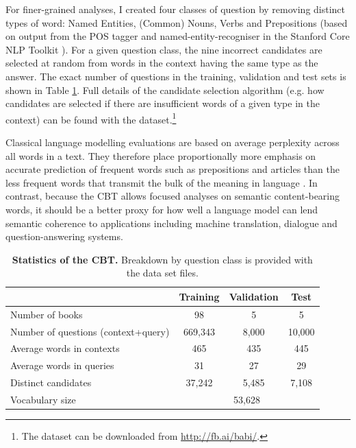 For finer-grained analyses, I created four classes of question by removing distinct types of word: Named Entities, (Common) Nouns, Verbs and Prepositions (based on output from the POS tagger and named-entity-recogniser in the Stanford Core NLP Toolkit \citep{manning2014stanford}). For a given question class, the nine incorrect candidates are selected at random from words in the context having the same type as the answer. The exact number of questions in the training, validation and test sets is shown in Table \ref{tab:cbt_stat}. Full details of the candidate selection algorithm (e.g. how candidates are selected if there are insufficient words of a given type in the context) can be found with the dataset.\footnote{The dataset can be downloaded from \url{http://fb.ai/babi/}.}

Classical language modelling evaluations are based on average perplexity across all words in a text. They therefore place proportionally more emphasis on accurate prediction of frequent words such as prepositions and articles than the less frequent words that transmit the bulk of the meaning in language \citep{baayen1996word}. In contrast, because the CBT allows focused analyses on semantic content-bearing words, it should be a better proxy for how well a language model can lend semantic coherence to applications including machine translation, dialogue and question-answering systems. 


\vspace{-2mm}
\begin{table}[ht]
\label{tab:cbt_stat}
  \begin{center}
    {\small 
      {\sc 
        \begin{tabular}{l|ccc}
          & Training & Validation & Test \\
          \hline
          \hline
          Number of books & 98 & 5 & 5 \\
          Number of questions (context+query)& 669,343 & 8,000 & 10,000  \\
          Average words in contexts & 465 & 435 & 445 \\
          Average words in queries & 31 & 27 & 29 \\
          Distinct candidates & 37,242 & 5,485 & 7,108 \\
          \hline
          Vocabulary size & \multicolumn{3}{|c}{53,628}\\
          \hline
        \end{tabular}
      }
    }
    \caption{\label{tab:cbt_stat} {\bf Statistics of the CBT.} Breakdown by question class is provided with the data set files.}
  \end{center}
\vspace*{-4ex}
\end{table}



